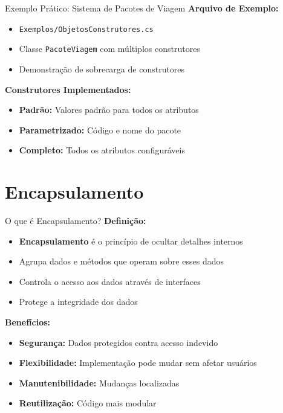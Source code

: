 \documentclass[aspectratio=169]{beamer}
\begin{document}
\begin{frame}{Exemplo Prático: Sistema de Pacotes de Viagem}
\textbf{Arquivo de Exemplo:}
\begin{itemize}
    \item \texttt{Exemplos/ObjetosConstrutores.cs}
    \item Classe \texttt{PacoteViagem} com múltiplos construtores
    \item Demonstração de sobrecarga de construtores
\end{itemize}

\textbf{Construtores Implementados:}
\begin{itemize}
    \item \textbf{Padrão:} Valores padrão para todos os atributos
    \item \textbf{Parametrizado:} Código e nome do pacote
    \item \textbf{Completo:} Todos os atributos configuráveis
\end{itemize}
\end{frame}

\section{Encapsulamento}

\begin{frame}{O que é Encapsulamento?}
\textbf{Definição:}
\begin{itemize}
    \item \textbf{Encapsulamento} é o princípio de ocultar detalhes internos
    \item Agrupa dados e métodos que operam sobre esses dados
    \item Controla o acesso aos dados através de interfaces
    \item Protege a integridade dos dados
\end{itemize}

\textbf{Benefícios:}
\begin{itemize}
    \item \textbf{Segurança:} Dados protegidos contra acesso indevido
    \item \textbf{Flexibilidade:} Implementação pode mudar sem afetar usuários
    \item \textbf{Manutenibilidade:} Mudanças localizadas
    \item \textbf{Reutilização:} Código mais modular
\end{itemize}
\end{frame}
\end{document}
